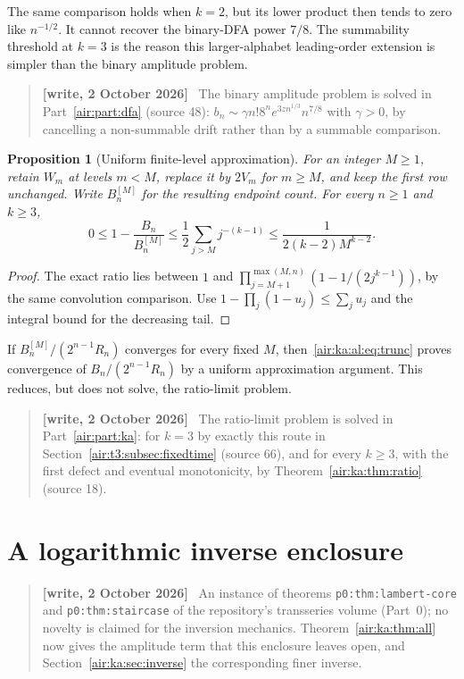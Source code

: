 \documentclass[11pt,letterpaper]{article}
\numberwithin{equation}{section}
\newtheorem{proposition}[theorem]{Proposition}
\theoremstyle{remark}
\newenvironment{writenote}{\par\smallskip\begin{quote}\small\textbf{[write, 2 October 2026]}\ }{\end{quote}\smallskip}
\newcommand{\repopath}[1]{\nolinkurl{#1}}
\begin{document}
The same comparison holds when $k=2$, but its lower product then tends to
zero like $n^{-1/2}$. It cannot recover the binary-DFA power $7/8$.
The summability threshold at $k=3$ is the reason this larger-alphabet
leading-order extension is simpler than the binary amplitude problem.
\begin{writenote}
The binary amplitude problem is solved in Part~\ref{air:part:dfa} (source 48): $b_n\sim\gamma n!8^ne^{3zn^{1/3}}n^{7/8}$ with $\gamma>0$, by cancelling a non-summable drift rather than by a summable comparison.
\end{writenote}


\begin{proposition}[Uniform finite-level approximation]\label{air:ka:al:prop:trunc}
For an integer $M\ge1$, retain $W_m$ at levels $m<M$, replace it by $2V_m$
for $m\ge M$, and keep the first row unchanged. Write $B_n^{[M]}$ for
the resulting endpoint count. For every $n\ge1$ and $k\ge3$,
\begin{equation}\label{air:ka:al:eq:trunc}
0\le1-\frac{B_n}{B_n^{[M]}}
\le\frac12\sum_{j>M}j^{-(k-1)}
\le\frac{1}{2(k-2)M^{k-2}}.
\end{equation}
\end{proposition}
\begin{proof}
The exact ratio lies between $1$ and
$\prod_{j=M+1}^{\max(M,n)}(1-1/(2j^{k-1}))$, by the same convolution
comparison. Use $1-\prod_j(1-u_j)\le\sum_j u_j$ and the integral bound
for the decreasing tail.
\end{proof}
If $B_n^{[M]}/(2^{n-1}R_n)$ converges for every fixed $M$,
then~\eqref{air:ka:al:eq:trunc} proves convergence of $B_n/(2^{n-1}R_n)$ by a uniform
approximation argument. This reduces, but does not solve, the ratio-limit problem.
\begin{writenote}
The ratio-limit problem is solved in Part~\ref{air:part:ka}: for $k=3$ by exactly this route in Section~\ref{air:t3:subsec:fixedtime} (source 66), and for every $k\ge3$, with the first defect and eventual monotonicity, by Theorem~\ref{air:ka:thm:ratio} (source 18).
\end{writenote}


\section{A logarithmic inverse enclosure}\label{air:ka:al:sec:inverse}
\begin{writenote}
An instance of theorems \repopath{p0:thm:lambert-core} and \repopath{p0:thm:staircase} of the repository's transseries volume (Part~0); no novelty is claimed for the inversion mechanics. Theorem~\ref{air:ka:thm:all} now gives the amplitude term that this enclosure leaves open, and Section~\ref{air:ka:sec:inverse} the corresponding finer inverse.
\end{writenote}
\end{document}
